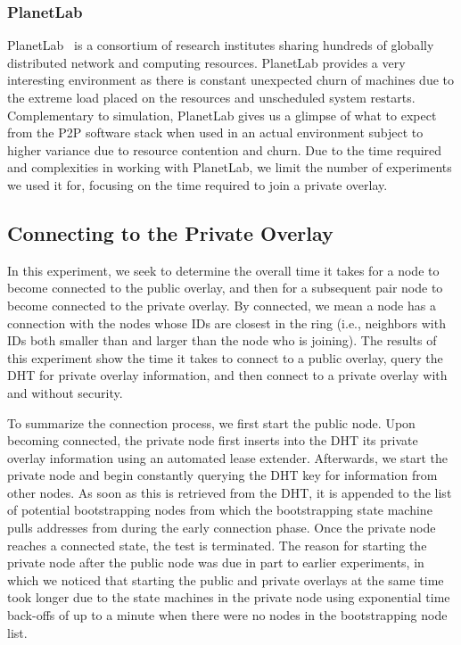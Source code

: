 \documentclass[conference]{IEEEtran}
\begin{document}
\subsubsection{PlanetLab}
PlanetLab~\cite{planetlab} is a consortium of research institutes sharing
hundreds of globally distributed network and computing resources.  PlanetLab
provides a very interesting environment as there is constant unexpected churn
of machines due to the extreme load placed on the resources and unscheduled system restarts.
Complementary to simulation, PlanetLab gives us a glimpse of what to expect
from the P2P software stack when used in an actual environment subject to higher
variance due to resource contention and churn.  Due to the time required and
complexities in working with PlanetLab, we limit the number of experiments we
used it for, focusing on the time required to join a private overlay.

\subsection{Connecting to the Private Overlay}
In this experiment, we seek to determine the overall time
it takes for a node to become connected to the public overlay, and then for a
subsequent pair node to become connected to the private overlay.  By connected, we
mean a node has a connection with the nodes whose IDs are closest in the ring (i.e., neighbors with IDs both smaller
than and larger than the node who is joining).  The results of this experiment
show the time it takes to connect to a public overlay, query the DHT for private overlay
information, and then connect to a private overlay with and without security.

To summarize the connection process, we first start the public node.  Upon
becoming connected, the private node first inserts into the DHT its 
private overlay information using an automated lease extender.  Afterwards, we
start the private node and begin constantly querying the DHT key for information
from other nodes.  As soon as this is retrieved from the DHT, it is appended to the list of
potential bootstrapping nodes from which the bootstrapping state machine pulls addresses
from during the early connection phase.  Once the private node
reaches a connected state, the test is terminated.  The reason for starting
the private node after the public node was due in part to earlier experiments,
in which we noticed that starting the public and private overlays at the same time took
longer due to the state machines in the private node using exponential time
back-offs of up to a minute when there were no nodes in the bootstrapping node list.
\end{document}
